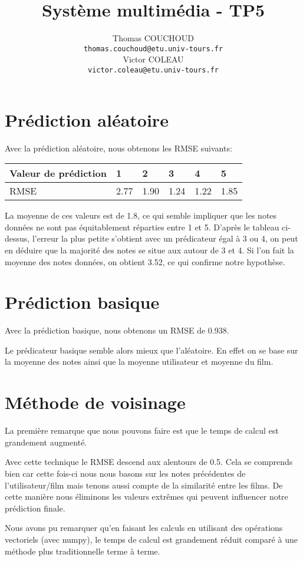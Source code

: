 \documentclass{report}
\title{Système multimédia - TP5}
\author{Thomas COUCHOUD\\\texttt{thomas.couchoud@etu.univ-tours.fr}\\Victor COLEAU\\\texttt{victor.coleau@etu.univ-tours.fr}}
\begin{document}
	\mccTitle

	\section{Prédiction aléatoire}
		Avec la prédiction aléatoire, nous obtenons les RMSE suivants:
		
		\begin{tabularx}{\textwidth}{|X|X|X|X|X|X|}
			\hline
			Valeur de prédiction & 1 & 2 & 3 & 4 & 5\\\hline
			RMSE & 2.77 & 1.90 & 1.24 & 1.22 & 1.85\\\hline
		\end{tabularx}
		
		La moyenne de ces valeurs est de 1.8, ce qui semble impliquer que les notes données ne sont pas équitablement réparties entre 1 et 5.
		D'après le tableau ci-dessus, l'erreur la plus petite s'obtient avec un prédicateur égal à 3 ou 4, on peut en déduire que la majorité des notes se situe aux autour de 3 et 4.
		Si l'on fait la moyenne des notes données, on obtient 3.52, ce qui confirme notre hypothèse.
		
	\section{Prédiction basique}
		Avec la prédiction basique, nous obtenons un RMSE de 0.938.
		
		Le prédicateur basique semble alors mieux que l'aléatoire.
		En effet on se base sur la moyenne des notes ainsi que la moyenne utilisateur et moyenne du film.
		
	\section{Méthode de voisinage}
		La première remarque que nous pouvons faire est que le temps de calcul est grandement augmenté.
		
		Avec cette technique le RMSE descend aux alentours de 0.5.
		Cela se comprends bien car cette fois-ci nous nous basons sur les notes précédentes de l'utilisateur/film mais tenons aussi compte de la similarité entre les films.
		De cette manière nous éliminons les valeurs extrêmes qui peuvent influencer notre prédiction finale.
		
		Nous avons pu remarquer qu'en faisant les calculs en utilisant des opérations vectoriels (avec numpy), le temps de calcul est grandement réduit comparé à une méthode plus traditionnelle terme à terme.
	
\end{document}
